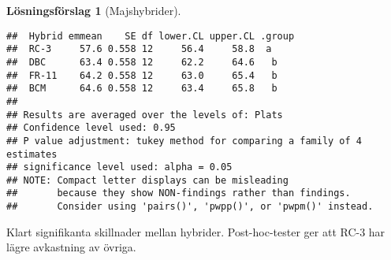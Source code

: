 \documentclass[
]{book}
\theoremstyle{definition}
\theoremstyle{definition}
\theoremstyle{definition}
\theoremstyle{definition}
\newtheorem{hypothesis}{Lösningsförslag}[chapter]
\theoremstyle{remark}
\begin{document}
\begin{hypothesis}[Majshybrider]
\begin{verbatim}
##  Hybrid emmean    SE df lower.CL upper.CL .group
##  RC-3     57.6 0.558 12     56.4     58.8  a    
##  DBC      63.4 0.558 12     62.2     64.6   b   
##  FR-11    64.2 0.558 12     63.0     65.4   b   
##  BCM      64.6 0.558 12     63.4     65.8   b   
## 
## Results are averaged over the levels of: Plats 
## Confidence level used: 0.95 
## P value adjustment: tukey method for comparing a family of 4 estimates 
## significance level used: alpha = 0.05 
## NOTE: Compact letter displays can be misleading
##       because they show NON-findings rather than findings.
##       Consider using 'pairs()', 'pwpp()', or 'pwpm()' instead.
\end{verbatim}

Klart signifikanta skillnader mellan hybrider. Post-hoc-tester ger att RC-3 har lägre avkastning av övriga.
\end{hypothesis}
\end{document}
